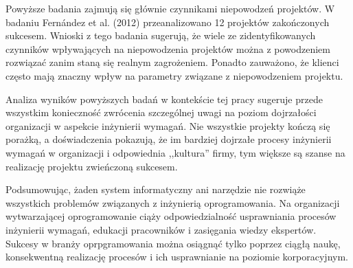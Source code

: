   Powyższe badania zajmują się głównie czynnikami niepowodzeń projektów. W badaniu Fern\'{a}ndez et al. (2012) przeanalizowano 12 projektów zakończonych sukcesem. Wnioski z tego badania sugerują, że wiele ze zidentyfikowanych czynników wpływających na niepowodzenia projektów można z powodzeniem rozwiązać zanim staną się realnym zagrożeniem. Ponadto zauważono, że klienci często mają znaczny wpływ na parametry związane z niepowodzeniem projektu. 

  Analiza wyników powyższych badań w kontekście tej pracy sugeruje przede wszystkim konieczność zwrócenia szczególnej uwagi na poziom dojrzałości organizacji w aspekcie inżynierii wymagań. Nie wszystkie projekty kończą się porażką, a doświadczenia pokazują, że im bardziej dojrzałe procesy inżynierii wymagań w organizacji i odpowiednia ,,kultura'' firmy, tym większe są szanse na realizację projektu zwieńczoną sukcesem. 

  Podsumowując, żaden system informatyczny ani narzędzie nie rozwiąże wszystkich problemów związanych z inżynierią oprogramowania. Na organizacji wytwarzającej oprogramowanie ciąży odpowiedzialność usprawniania procesów inżynierii wymagań, edukacji pracowników i zasięgania wiedzy ekspertów. Sukcesy w branży oprpgramowania można osiągnąć tylko poprzez ciągłą naukę, konsekwentną realizację procesów i ich usprawnianie na poziomie korporacyjnym.
